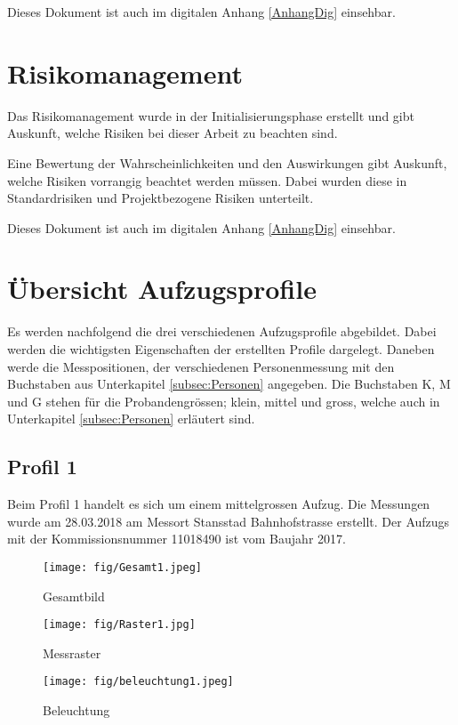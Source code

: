 Dieses Dokument ist auch im digitalen Anhang \ref{AnhangDig} einsehbar.


%

%



\chapter{Risikomanagement}
\label{AnhangC}
\setcounter{page}{9}
Das Risikomanagement wurde in der Initialisierungsphase erstellt und gibt Auskunft, welche Risiken bei dieser Arbeit zu beachten sind.

Eine Bewertung der Wahrscheinlichkeiten und den Auswirkungen gibt Auskunft, welche Risiken vorrangig beachtet werden müssen.  Dabei wurden diese in Standardrisiken und Projektbezogene Risiken unterteilt.

Dieses Dokument ist auch im digitalen Anhang \ref{AnhangDig} einsehbar.


\chapter{Übersicht Aufzugsprofile }
\label{AnhangD}

Es werden nachfolgend die drei verschiedenen Aufzugsprofile abgebildet. Dabei werden die wichtigsten Eigenschaften der erstellten Profile dargelegt. Daneben werde die Messpositionen, der verschiedenen Personenmessung mit den Buchstaben aus Unterkapitel \ref{subsec:Personen} angegeben. Die Buchstaben K, M und G stehen für die Probandengrössen; klein, mittel und gross, welche auch in  Unterkapitel \ref{subsec:Personen} erläutert sind.
\newpage


\section{Profil 1}
Beim Profil 1 handelt es sich um einem mittelgrossen Aufzug. Die Messungen wurde am 28.03.2018 am Messort Stansstad Bahnhofstrasse erstellt. Der Aufzugs mit der Kommissionsnummer 11018490 ist vom Baujahr 2017.
 


		\begin{figure}[!ht]
	\centering
	\begin{minipage}[b]{0.3\linewidth}
		\centering
		\texttt{[image: fig/Gesamt1.jpeg]}
		\caption{Gesamtbild}
		\label{fig:profilAnhang1}
	\end{minipage}
	\begin{minipage}[b]{0.3\linewidth}
		\centering
		\texttt{[image: fig/Raster1.jpg]}
		\caption{Messraster}
		\label{fig:profilAnhang2}
	\end{minipage}
	\begin{minipage}[b]{0.3\linewidth}
		\centering
		\texttt{[image: fig/beleuchtung1.jpeg]}
		\caption{Beleuchtung}
		\label{fig:profilAnhang3}
	\end{minipage}
\end{figure}

